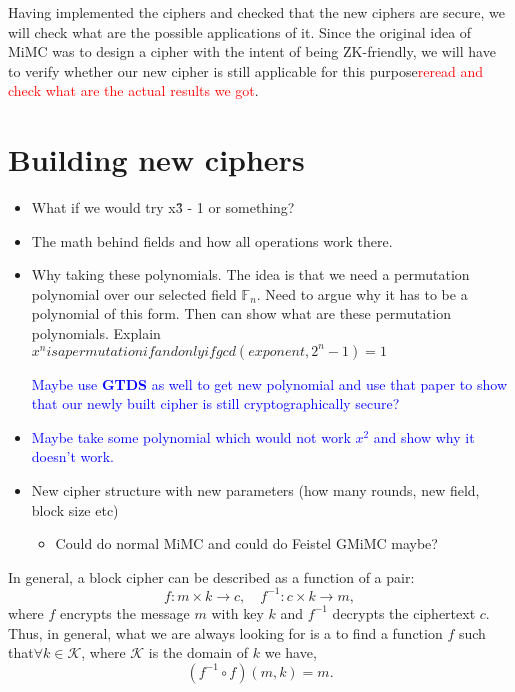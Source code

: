 \documentclass{Resources/UoBLab1}
\theoremstyle{definition}
\begin{document}
Having implemented the ciphers and checked that the new ciphers are secure, we will check what are the possible applications of it. Since the original idea of MiMC was to design a cipher with the intent of being ZK-friendly, we will have to verify whether our new cipher is still applicable for this purpose\textcolor{red}{reread and check what are the actual results we got}.


\section{Building new ciphers}
\begin{itemize}
    \item What if we would try x\^ 3 - 1 or something?
    \item The math behind fields and how all operations work there.
    \item Why taking these polynomials. The idea is that we need a permutation polynomial over our selected field $\mathbb{F}_n$. Need to argue why it has to be a polynomial of this form. Then can show what are these permutation polynomials. Explain \(x^n is a permutation if and only if gcd(exponent, 2^n - 1) = 1\)\par
    \textcolor{blue}{Maybe use \textbf{GTDS} as well to get new polynomial and use that paper to show that our newly built cipher is still cryptographically secure?}
    \item \textcolor{blue}{Maybe take some polynomial which would not work $x^2$ and show why it doesn't work.}
    \item New cipher structure with new parameters (how many rounds, new field, block size etc)
    \begin{itemize}
        \item Could do normal MiMC and could do Feistel GMiMC maybe?
    \end{itemize}
\end{itemize}
\vspace{10pt}
In general, a block cipher can be described as a function of a pair:
\[
f : m \times k \to c,\quad f^{-1} : c \times k \to m,
\]
where $f$ encrypts the message $m$ with key $k$ and $f^{-1}$ decrypts the ciphertext $c$. Thus, in general, what we are always looking for is a to find a function $f$ such that\(\forall k \in \mathcal{K}\), where $\mathcal{K}$ is the domain of $k$ we have,
\[
(f^{-1} \circ f)(m, k) = m.
\]
\end{document}
